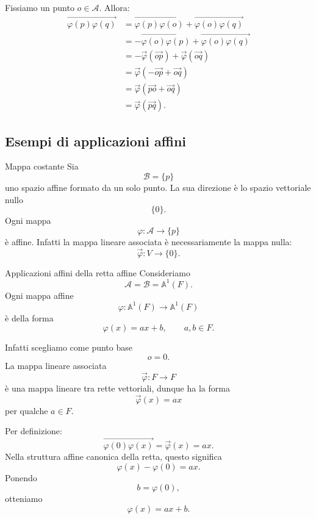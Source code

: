 \documentclass[a4paper]{article}
\begin{document}
\begin{snippetproof}{}
    Fissiamo un punto \(o\in\mathcal{A}\). Allora:
    \begin{align*}
        \overrightarrow{\varphi(p)\varphi(q)}
        &=
        \overrightarrow{\varphi(p)\varphi(o)}
        +
        \overrightarrow{\varphi(o)\varphi(q)}\\
        &=
        -\overrightarrow{\varphi(o)\varphi(p)}
        +
        \overrightarrow{\varphi(o)\varphi(q)}\\
        &=
        -\overrightarrow{\varphi}(\overrightarrow{op})
        +
        \overrightarrow{\varphi}(\overrightarrow{oq})\\
        &=
        \overrightarrow{\varphi}(-\overrightarrow{op}+\overrightarrow{oq})\\
        &=
        \overrightarrow{\varphi}(\overrightarrow{po}+\overrightarrow{oq})\\
        &=
        \overrightarrow{\varphi}(\overrightarrow{pq}).
    \end{align*}
\end{snippetproof}

\subsection{Esempi di applicazioni affini}

\begin{snippetexample}{Mappa costante}
    Sia
    \[
        \mathcal{B}=\{p\}
    \]
    uno spazio affine formato da un solo punto. La sua direzione è lo spazio vettoriale nullo
    \[
        \{0\}.
    \]
    Ogni mappa
    \[
        \varphi:\mathcal{A}\to\{p\}
    \]
    è affine. Infatti la mappa lineare associata è necessariamente la mappa nulla:
    \[
        \overrightarrow{\varphi}:V\to\{0\}.
    \]
\end{snippetexample}

\begin{snippetexample}{Applicazioni affini della retta affine}
    Consideriamo
    \[
        \mathcal{A}=\mathcal{B}=\mathbb{A}^1(F).
    \]
    Ogni mappa affine
    \[
        \varphi:\mathbb{A}^1(F)\to\mathbb{A}^1(F)
    \]
    è della forma
    \[
        \varphi(x)=ax+b,
        \qquad
        a,b\in F.
    \]

    Infatti scegliamo come punto base
    \[
        o=0.
    \]
    La mappa lineare associata
    \[
        \overrightarrow{\varphi}:F\to F
    \]
    è una mappa lineare tra rette vettoriali, dunque ha la forma
    \[
        \overrightarrow{\varphi}(x)=ax
    \]
    per qualche \(a\in F\).

    Per definizione:
    \[
        \overrightarrow{\varphi(0)\varphi(x)}
        =
        \overrightarrow{\varphi}(x)
        =
        ax.
    \]
    Nella struttura affine canonica della retta, questo significa
    \[
        \varphi(x)-\varphi(0)=ax.
    \]
    Ponendo
    \[
        b=\varphi(0),
    \]
    otteniamo
    \[
        \varphi(x)=ax+b.
    \]
\end{snippetexample}
\end{document}
